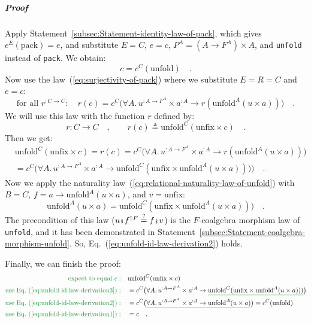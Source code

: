 \subparagraph{Proof}

Apply Statement~\ref{subsec:Statement-identity-law-of-pack}, which
gives $e^{E}(\text{pack})=e$, and substitute $E=C$, $e=c$, $P^{A}=(A\rightarrow F^{A})\times A$,
and \lstinline!unfold! instead of \lstinline!pack!. We obtain:
\begin{equation}
c=c^{C}(\text{unfold})\quad.\label{eq:unfold-id-law-derivation1}
\end{equation}
Now use the law~(\ref{eq:surjectivity-of-pack}) where we substitute
$E=R=C$ and $e=c$:
\[
\text{for all }r^{:C\rightarrow C}:\quad r(c)=c^{C}\big(\forall A.\,u^{:A\rightarrow F^{A}}\times a^{:A}\rightarrow r(\text{unfold}^{A}(u\times a))\big)\quad.
\]
We will use this law with the function $r$ defined by:
\[
r:C\rightarrow C\quad,\quad\quad r(c)\triangleq\text{unfold}^{C}(\text{unfix}\times c)\quad.
\]
Then we get:
\begin{align}
 & \text{unfold}^{C}(\text{unfix}\times c)=r(c)=c^{C}\big(\forall A.\,u^{:A\rightarrow F^{A}}\times a^{:A}\rightarrow r(\text{unfold}^{A}(u\times a))\big)\nonumber \\
 & =c^{C}\big(\forall A.\,u^{:A\rightarrow F^{A}}\times a^{:A}\rightarrow\text{unfold}^{C}(\text{unfix}\times\text{unfold}^{A}(u\times a)))\big)\quad.\label{eq:unfold-id-law-derivation3}
\end{align}
Now we apply the naturality law~(\ref{eq:relational-naturality-law-of-unfold})
with $B=C$, $f=a\rightarrow\text{unfold}^{A}(u\times a)$, and $v=\text{unfix}$:
\begin{equation}
\text{unfold}^{A}(u\times a)=\text{unfold}^{C}(\text{unfix}\times\text{unfold}^{A}(u\times a)))\quad.\label{eq:unfold-id-law-derivation2}
\end{equation}
The precondition of this law ($u\bef f^{\uparrow F}\overset{?}{=}f\bef v$)
is the $F$-coalgebra morphism law of \lstinline!unfold!, and it
has been demonstrated in Statement~\ref{subsec:Statement-coalgebra-morphism-unfold}.
So, Eq.~(\ref{eq:unfold-id-law-derivation2}) holds. 

Finally, we can finish the proof:
\begin{align*}
{\color{greenunder}\text{expect to equal }c:}\quad & \text{unfold}^{C}(\text{unfix}\times c)\\
{\color{greenunder}\text{use Eq.~(\ref{eq:unfold-id-law-derivation3})}:}\quad & =c^{C}\big(\forall A.\,u^{:A\rightarrow F^{A}}\times a^{:A}\rightarrow\gunderline{\text{unfold}^{C}(\text{unfix}\times\text{unfold}^{A}(u\times a)))}\big)\\
{\color{greenunder}\text{use Eq.~(\ref{eq:unfold-id-law-derivation2})}:}\quad & =c^{C}\big(\gunderline{\forall A.\,u^{:A\rightarrow F^{A}}\times a^{:A}\rightarrow\text{unfold}^{A}(u\times a)}\big)=c^{C}(\text{unfold})\\
{\color{greenunder}\text{use Eq.~(\ref{eq:unfold-id-law-derivation1})}:}\quad & =c\quad.
\end{align*}


